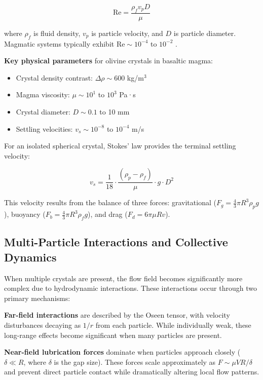 \begin{equation}
\text{Re} = \frac{\rho_f v_p D}{\mu}
\end{equation}

where $\rho_f$ is fluid density, $v_p$ is particle velocity, and $D$ is particle diameter. Magmatic systems typically exhibit $\text{Re} \sim 10^{-4}$ to $10^{-2}$ \cite{martin1988crystal,martin1989fluid}.

\textbf{Key physical parameters} for olivine crystals in basaltic magma:
\begin{itemize}
    \item Crystal density contrast: $\Delta\rho \sim 600$ kg/m$^3$
    \item Magma viscosity: $\mu \sim 10^1$ to $10^3$ Pa·s
    \item Crystal diameter: $D \sim 0.1$ to 10 mm
    \item Settling velocities: $v_s \sim 10^{-8}$ to $10^{-4}$ m/s
\end{itemize}

For an isolated spherical crystal, Stokes' law provides the terminal settling velocity:

\begin{equation}
v_s = \frac{1}{18} \cdot \frac{(\rho_p - \rho_f)}{\mu} \cdot g \cdot D^2
\label{eq:stokes_law}
\end{equation}

This velocity results from the balance of three forces: gravitational ($F_g = \frac{4}{3}\pi R^3 \rho_p g$), buoyancy ($F_b = \frac{4}{3}\pi R^3 \rho_f g$), and drag ($F_d = 6\pi\mu R v$).

\subsection{Multi-Particle Interactions and Collective Dynamics}

When multiple crystals are present, the flow field becomes significantly more complex due to hydrodynamic interactions. These interactions occur through two primary mechanisms:

\textbf{Far-field interactions} are described by the Oseen tensor, with velocity disturbances decaying as $1/r$ from each particle. While individually weak, these long-range effects become significant when many particles are present.

\textbf{Near-field lubrication forces} dominate when particles approach closely ($\delta \ll R$, where $\delta$ is the gap size). These forces scale approximately as $F \sim \mu V R/\delta$ and prevent direct particle contact while dramatically altering local flow patterns.

